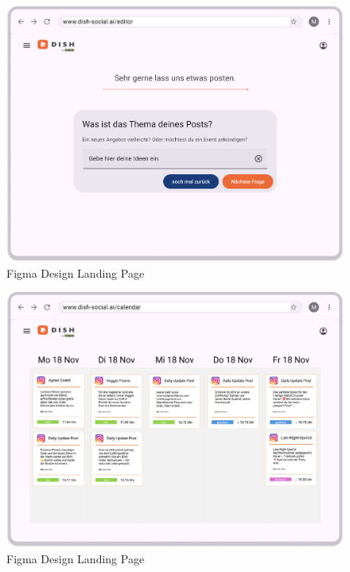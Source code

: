 \begin{figure}[htbp]
    \centering
    \includegraphics[width=\textwidth]{abbildungen/figma/Editor}
    \caption{Figma Design Landing Page}
    \label{fig:editor-page}
\end{figure}
\newpage

\begin{figure}[htbp]
    \centering
    \includegraphics[width=\textwidth]{abbildungen/figma/Kalender}
    \caption{Figma Design Landing Page}
    \label{fig:calendar-page}
\end{figure}